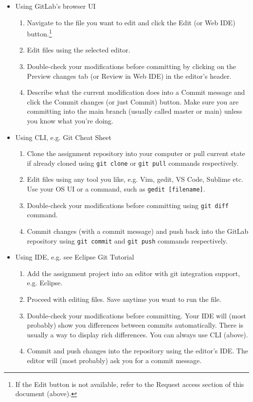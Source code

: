 \begin{itemize}
\item
  {Using GitLab's browser UI}
    \begin{enumerate}
    \item
      {Navigate to the file you want to edit and click the Edit (or Web IDE) button.\footnote{If the Edit button is not available, refer to the Request access section of this document (above).}}
    \item
      {Edit files using the selected editor.}
    \item
      {Double-check your modifications before committing by clicking on the Preview changes tab (or Review in Web IDE) in the editor's header.}
    \item
      {Describe what the current modification does into a Commit message and click the Commit changes (or just Commit) button. Make sure you are committing into the main branch (usually called master or main) unless you know what you're doing.}
    \end{enumerate}

\item
  {Using CLI, e.g. Git Cheat Sheet}
    \begin{enumerate}
    \item
      {Clone the assignment repository into your computer or pull current state if already cloned using \texttt{git clone} or \texttt{git pull} commands respectively.}
    \item
      {Edit files using any tool you like, e.g. Vim, gedit, VS Code, Sublime etc. Use your OS UI or a command, such as \texttt{gedit {[}filename{]}}.}
    \item
      {Double-check your modifications before committing using \texttt{git diff} command.}
    \item
      {Commit changes (with a commit message) and push back into the GitLab repository using \texttt{git commit} and \texttt{git push} commands respectively.}
    \end{enumerate}
\item
  {Using IDE, e.g. see Eclipse Git Tutorial}
    \begin{enumerate}
    \item
      {Add the assignment project into an editor with git integration support, e.g. Eclipse.}
    \item
      {Proceed with editing files. Save anytime you want to run the file.}
    \item
      {Double-check your modifications before committing. Your IDE will (most probably) show you differences between commits automatically. There is usually a way to display rich differences. You can always use CLI (above).}
    \item
      {Commit and push changes into the repository using the editor's IDE. The editor will (most probably) ask you for a commit message.}
    \end{enumerate}
\end{itemize}

